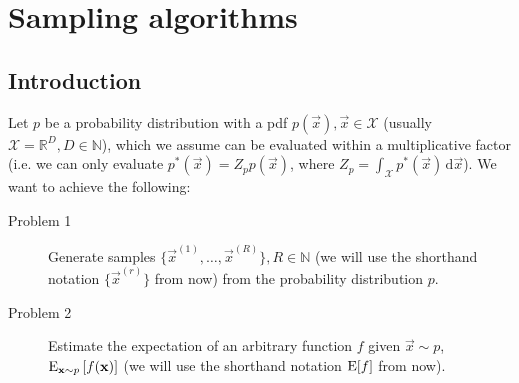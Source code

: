 \chapter{Sampling algorithms}
\section{Introduction}
    Let $p$ be a probability distribution with a pdf $p(\vec x), \vec x \in \mathcal X$ (usually $\mathcal X = \mathbb R^D, D \in \mathbb N$), which we assume can be evaluated within a multiplicative factor (i.e. we can only evaluate $p^\ast(\vec x) = Z_p p(\vec x)$, where $Z_p = \int_{\mathcal X} p^\ast(\vec x)\,\mathrm d\vec x$). We want to achieve the following:
    \begin{description}
        \item[Problem 1] Generate samples $\{\vec x^{(1)}, \dotsc, \vec x^{(R)}\}, R \in \mathbb N$ (we will use the shorthand notation $\{\vec x^{(r)}\}$ from now) from the probability distribution $p$.
        \item[Problem 2] Estimate the expectation of an arbitrary function $f$ given $\vec x \sim p$, $\operatorname{\mathrm{E}}_{\boldsymbol{\mathbf{x}} \sim p}\left[f(\boldsymbol{\mathbf{x}})\right]$ (we will use the shorthand notation $\operatorname{\mathrm{E}}[f]$ from now). 
    \end{description}






